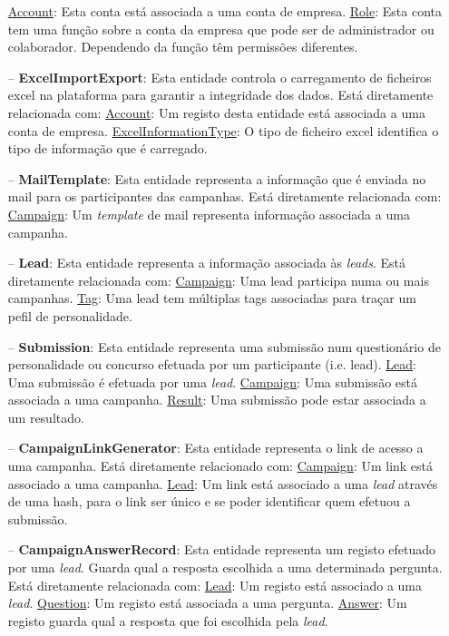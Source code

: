 \begin{itemize}
	\subitem \underline{Account}: Esta conta está associada a uma conta de empresa.
	\subitem \underline{Role}: Esta conta tem uma função sobre a conta da empresa que pode ser de administrador ou colaborador. Dependendo da função têm permissões diferentes.
	\item[--] \textbf{ExcelImportExport}: Esta entidade controla o carregamento de ficheiros excel na plataforma para garantir a integridade dos dados. Está diretamente relacionada com:
	\subitem \underline{Account}: Um registo desta entidade está associada a uma conta de empresa.
	\subitem \underline{ExcelInformationType}: O tipo de ficheiro excel identifica o tipo de informação que é carregado.
	\item[--] \textbf{MailTemplate}: Esta entidade representa a informação que é enviada no mail para os participantes das campanhas. Está diretamente relacionada com:
	\subitem \underline{Campaign}: Um \textit{template} de mail representa informação associada a uma campanha.
	\item[--] \textbf{Lead}: Esta entidade representa a informação associada às \textit{leads}. Está diretamente relacionada com:
	\subitem \underline{Campaign}: Uma lead participa numa ou mais campanhas.
	\subitem \underline{Tag}: Uma lead tem múltiplas tags associadas para traçar um pefil de personalidade.
	\item[--] \textbf{Submission}: Esta entidade representa uma submissão num questionário de personalidade ou concurso efetuada por um participante (i.e. lead).
	\subitem \underline{Lead}: Uma submissão é efetuada por uma \textit{lead}.
	\subitem \underline{Campaign}: Uma submissão está associada a uma campanha.
	\subitem \underline{Result}: Uma submissão pode estar associada a um resultado.
	\item[--] \textbf{CampaignLinkGenerator}: Esta entidade representa o link de acesso a uma campanha. Está diretamente relacionado com:
	\subitem \underline{Campaign}: Um link está associado a uma campanha.
	\subitem \underline{Lead}: Um link está associado a uma \textit{lead} através de uma hash, para o link ser único e se poder identificar quem efetuou a submissão.
	\item[--] \textbf{CampaignAnswerRecord}: Esta entidade representa um registo efetuado por uma \textit{lead}. Guarda qual a resposta escolhida a uma determinada pergunta. Está diretamente relacionada com:
	\subitem \underline{Lead}: Um registo está associado a uma \textit{lead}.
	\subitem \underline{Question}: Um registo está associada a uma pergunta.
	\subitem \underline{Answer}: Um registo guarda qual a resposta que foi escolhida pela \textit{lead}.

\end{itemize}
